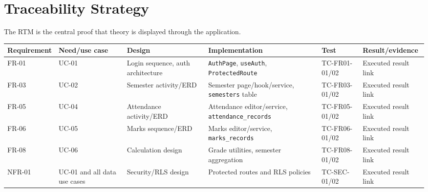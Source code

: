 \documentclass[
  10pt,
  a4paper,
  oneside]{report}
\newcounter{none} %
\begin{document}
\chapter{Traceability Strategy}\label{17-traceability-strategy}

The RTM is the central proof that theory is displayed through the
application.

{\def\LTcaptype{none} %
\begin{longtable}[]{@{}
  >{\raggedright\arraybackslash}p{}
  >{\raggedright\arraybackslash}p{}
  >{\raggedright\arraybackslash}p{}
  >{\raggedright\arraybackslash}p{}
  >{\raggedright\arraybackslash}p{}
  >{\raggedright\arraybackslash}p{}@{}}
\toprule\noalign{}
\begin{minipage}[b]{\linewidth}\raggedright
Requirement
\end{minipage} & \begin{minipage}[b]{\linewidth}\raggedright
Need/use case
\end{minipage} & \begin{minipage}[b]{\linewidth}\raggedright
Design
\end{minipage} & \begin{minipage}[b]{\linewidth}\raggedright
Implementation
\end{minipage} & \begin{minipage}[b]{\linewidth}\raggedright
Test
\end{minipage} & \begin{minipage}[b]{\linewidth}\raggedright
Result/evidence
\end{minipage} \\
\midrule\noalign{}
\endhead
\bottomrule\noalign{}
\endlastfoot
FR-01 & UC-01 & Login sequence, auth architecture & \texttt{AuthPage},
\texttt{useAuth}, \texttt{ProtectedRoute} & TC-FR01-01/02 & Executed
result link \\
FR-03 & UC-02 & Semester activity/ERD & Semester page/hook/service,
\texttt{semesters} table & TC-FR03-01/02 & Executed result link \\
FR-05 & UC-04 & Attendance activity/ERD & Attendance editor/service,
\texttt{attendance\_records} & TC-FR05-01/02 & Executed result link \\
FR-06 & UC-05 & Marks sequence/ERD & Marks editor/service,
\texttt{marks\_records} & TC-FR06-01/02 & Executed result link \\
FR-08 & UC-06 & Calculation design & Grade utilities, semester
aggregation & TC-FR08-01/02 & Executed result link \\
NFR-01 & UC-01 and all data use cases & Security/RLS design & Protected
routes and RLS policies & TC-SEC-01/02 & Executed result link \\
\end{longtable}
}
\end{document}
